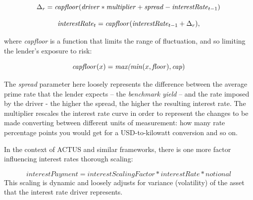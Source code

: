 \documentclass[runningheads]{llncs}
\newcommand{\ident}[1]{\mbox{\emph{#1}}}
\begin{document}


\noindent 
\begin{equation*}
\Delta_{r}=\ident{capfloor}(\ident{driver}*\ident{multiplier}+\ident{spread}-\ident{interestRate}_{t-1})
\end{equation*}

\noindent 
\begin{equation*}
\ident{interestRate}_{t}=\ident{capfloor}(\ident{interestRate}_{t-1}+\Delta_{r}),
\end{equation*}

\noindent
where \emph{capfloor} is a function that limits the range of fluctuation,  
and so limiting the lender's exposure to risk:

\noindent 
\begin{equation*}
\ident{capfloor}(x)=\ident{max(min}(x,\ident{floor}),\ident{cap})
\end{equation*}

\noindent
The \emph{spread} parameter here loosely represents the difference between
the average prime 
rate that the lender expects -- the \emph{benchmark yield} -- and
the rate imposed by the driver - the higher the spread, the higher
the resulting interest rate. The multiplier %
rescales the interest rate curve 
in order to represent the changes to be made converting between different units
of measurement: how many rate percentage points 
you would get for a USD-to-kilowatt conversion
and so on.

In the context of ACTUS and similar frameworks, 
there is
one more factor influencing interest rates thorough scaling:

\noindent 
\begin{equation*}
interestPayment=interestScalingFactor*interestRate*notional
\end{equation*}
\noindent
This scaling is dynamic and loosely adjusts for variance (volatility)
of the asset that the interest rate driver represents.
\end{document}
